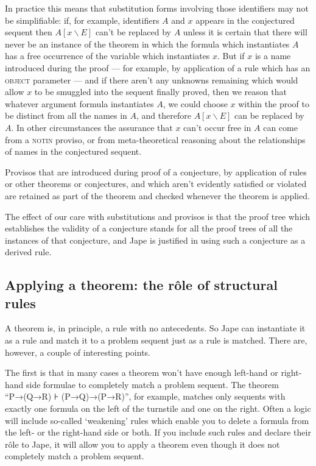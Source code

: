 In practice this means that substitution forms involving those identifiers may not be simplifiable: if, for example, identifiers $A$ and $x$ appears in the conjectured sequent then $A[x\backslash E]$ can't be replaced by $A$ unless it is certain that there will never be an instance of the theorem in which the formula which instantiates $A$ has a free occurrence of the variable which instantiates $x$. But if $x$ is a name introduced during the proof --- for example, by application of a rule which has an \textsc{object} parameter --- and if there aren't any unknowns remaining which would allow $x$ to be smuggled into the sequent finally proved, then we reason that whatever argument formula instantiates $A$, we could choose $x$ within the proof to be distinct from all the names in $A$, and therefore $A[x\backslash E]$ can be replaced by $A$. In other circumstances the assurance that $x$ can't occur free in $A$ can come from a \textsc{notin} proviso, or from meta-theoretical reasoning about the relationships of names in the conjectured sequent.

Provisos that are introduced during proof of a conjecture, by application of rules or other theorems or conjectures, and which aren't evidently satisfied or violated are retained as part of the theorem and checked whenever the theorem is applied.

The effect of our care with substitutions and provisos is that the proof tree which establishes the validity of a conjecture stands for all the proof trees of all the instances of that conjecture, and Jape is justified in using such a conjecture as a derived rule.

\subsection{Applying a theorem: the r\^{o}le of structural rules}
\label{sec:basics:application}

A theorem is, in principle, a rule with no antecedents. So Jape can instantiate it as a rule and match it to a problem sequent just as a rule is matched. There are, however, a couple of interesting points.

The first is that in many cases a theorem won't have enough left-hand or right-hand side formulae to completely match a problem sequent. The theorem ``P→(Q→R) ⊦ (P→Q)→(P→R)'', for example, matches only sequents with exactly one formula on the left of the turnstile and one on the right. Often a logic will include so-called `weakening' rules which enable you to delete a formula from the left- or the right-hand side or both. If you include such rules and declare their r\^{o}le to Jape, it will allow you to apply a theorem even though it does not completely match a problem sequent.

